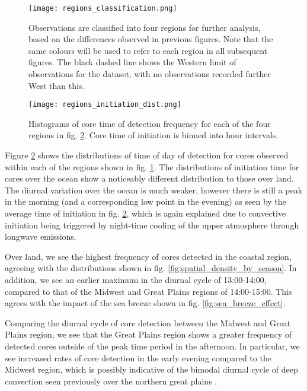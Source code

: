 \begin{figure}[t]
    \centering
    \texttt{[image: regions\_classification.png]}
    \caption{Observations are classified into four regions for further analysis, based on the differences observed in previous figures. Note that the same colours will be used to refer to each region in all subsequent figures. The black dashed line shows the Western limit of observations for the dataset, with no observations recorded further West than this.}
    \label{fig:regions}
\end{figure}

\begin{figure}[h]
    \centering
    \texttt{[image: regions\_initiation\_dist.png]}
    \caption{Histograms of core time of detection frequency for each of the four regions in fig. \ref{fig:regional_tod}. Core time of initiation is binned into hour intervals.}
    \label{fig:regional_tod}
\end{figure}

Figure \ref{fig:regional_tod} shows the distributions of time of day of detection for cores observed within each of the regions shown in fig. \ref{fig:regions}.
The distributions of initiation time for cores over the ocean show a noticeably different distribution to those over land.
The diurnal variation over the ocean is much weaker, however there is still a peak in the morning (and a corresponding low point in the evening) as seen by the average time of initiation in fig. \ref{fig:regional_tod}, which is again explained due to convective initiation being triggered by night-time cooling of the upper atmosphere through longwave emissions.

Over land, we see the highest frequency of cores detected in the coastal region, agreeing with the distributions shown in fig. \ref{fig:spatial_density_by_season}.
In addition, we see an earlier maximum in the diurnal cycle of 13:00-14:00, compared to that of the Midwest and Great Plains regions of 14:00-15:00.
This agrees with the impact of the sea breeze shown in fig. \ref{fig:sea_breeze_effect}.

Comparing the diurnal cycle of core detection between the Midwest and Great Plains region, we see that the Great Plains region shows a greater frequency of detected cores outside of the peak time period in the afternoon.
In particular, we see increased rates of core detection in the early evening compared to the Midwest region, which is possibly indicative of the bimodal diurnal cycle of deep convection seen previously over the northern great plains \citep{feng_spatiotemporal_2019, li_high-resolution_2021}.

